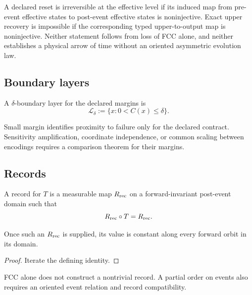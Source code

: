 \documentclass[11pt]{article}
\theoremstyle{plain}
\theoremstyle{plain}
\begin{document}
\begin{proposition}
A declared reset is irreversible at the effective level if its induced map
from pre-event effective states to post-event effective states is
noninjective.  Exact upper recovery is impossible if the corresponding typed
upper-to-output map is noninjective.  Neither statement follows from loss of
FCC alone, and neither establishes a physical arrow of time without an
oriented asymmetric evolution law.
\end{proposition}

\subsection{Boundary layers}

\begin{definition}
A $\delta$-boundary layer for the declared margins is
\[
\mathcal L_\delta:=\{x:0<C(x)\le\delta\}.
\]
\end{definition}

\begin{remark}
Small margin identifies proximity to failure only for the declared contract.
Sensitivity amplification, coordinate independence, or common scaling
between encodings requires a comparison theorem for their margins.
\end{remark}

\subsection{Records}

\begin{definition}[Record]
A record for $T$ is a measurable map $R_{\rm rec}$ on a forward-invariant
post-event domain such that
\[
R_{\rm rec}\circ T=R_{\rm rec}.
\]
\end{definition}

\begin{proposition}
Once such an $R_{\rm rec}$ is supplied, its value is constant along every
forward orbit in its domain.
\end{proposition}

\begin{proof}
Iterate the defining identity.
\end{proof}

FCC alone does not construct a nontrivial record.  A partial order on events
also requires an oriented event relation and record compatibility.
\end{document}
